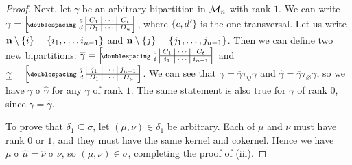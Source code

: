 \begin{lemma}
\begin{proof}
    Next, let $\gamma$ be an arbitrary bipartition in $\mathcal{M}_n$ with rank $1$.
    We can write
    $\gamma = \bipart{c|c|c|c}{2-4}
    {c & C_1 & \cdots & C_t}{d & D_1 & \cdots & D_u}$,
    where $\{c,d'\}$ is the one transversal.  Let us write
    $\mathbf{n} \setminus \{i\} = \{i_1, \ldots, i_{n-1}\}$ and
    $\mathbf{n} \setminus \{j\} = \{j_1, \ldots, j_{n-1}\}$.  Then we can define two
    new bipartitions:
    $\overline\gamma = \bipart{c|c|c|c}{2-4}
    {c & C_1 & \cdots & C_t}{i & i_1 & \cdots & i_{n-1}}$ and
    $\underline\gamma = \bipart{c|c|c|c}{2-4}
    {j & j_1 & \cdots & j_{n-1}}{d & D_1 & \cdots & D_u}$.
    We can see that $\gamma = \overline\gamma \tau_{ij} \underline\gamma$ and
    $\widehat\gamma = \overline\gamma \tau_\varnothing \underline\gamma$, so
    we have $\gamma \mathrel\sigma \widehat\gamma$ for any $\gamma$ of rank
    $1$.  The same statement is also true for $\gamma$ of rank $0$, since
    $\gamma = \widehat\gamma$.

    To prove that $\delta_1 \subseteq \sigma$, let $(\mu, \nu) \in \delta_1$ be
    arbitrary.  Each of $\mu$ and $\nu$ must have rank $0$ or $1$, and they must
    have the same kernel and cokernel.  Hence we have
    $\mu \mathrel\sigma \widehat\mu = \widehat\nu \mathrel\sigma \nu$, so
    $(\mu, \nu) \in \sigma$, completing the proof of (iii).
  \end{proof}
\end{lemma}

